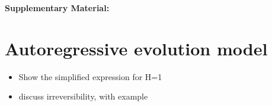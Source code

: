 \begin{center}
\textbf{\large Supplementary Material: \papertitle}
\end{center}

\section{Autoregressive evolution model} %
\label{sec:autoregressive_evolution_model}

\begin{itemize}
	\item Show the simplified expression for H=1
	\item discuss irreversibility, with example
\end{itemize}

